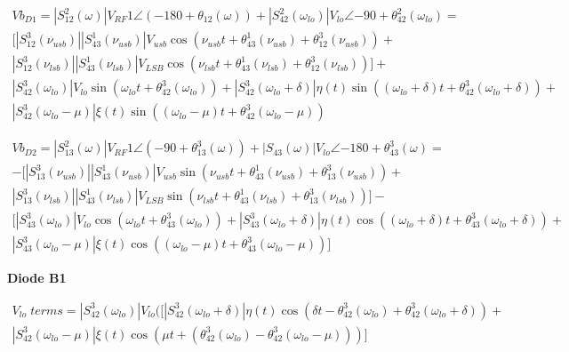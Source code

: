 \begin{equation}
    \begin{gathered}
        Vb_{D1} = |S_{12}^2(\omega)|V_{RF}1 \angle(-180+\theta_{12}(\omega)) + |S_{42}^2(\omega_{lo})|V_{lo}\angle{-90+\theta_{42}^2(\omega_{lo})} =\\
        \big[
        |S_{12}^3(\nu_{usb})||S_{43}^1(\nu_{usb})|V_{usb}\cos(\nu_{usb}t+\theta_{43}^1(\nu_{usb})+\theta_{12}^3(\nu_{usb}))+\\
        |S_{12}^3(\nu_{lsb})||S_{43}^1(\nu_{lsb})|V_{LSB}\cos(\nu_{lsb}t+\theta_{43}^1(\nu_{lsb})+\theta_{12}^3(\nu_{lsb}))\big]  + \\
        |S_{42}^3(\omega_{lo})|V_{lo}\sin(\omega_{lo}t+\theta_{42}^3(\omega_{lo}))+
        |S_{42}^3(\omega_{lo}+\delta)|\eta(t)\sin((\omega_{lo}+\delta)t+\theta_{42}^3(\omega_{lo}+\delta))+\\
        |S_{42}^3(\omega_{lo}-\mu)|\xi(t)\sin((\omega_{lo}-\mu)t+\theta_{42}^3(\omega_{lo}-\mu))
    \end{gathered}
\end{equation}

\vspace{1cm}

\begin{equation}
    \begin{gathered}
        Vb_{D2} = |S_{13}^2(\omega)|V_{RF}1 \angle(-90+\theta_{13}^3(\omega)) + |S_{43}(\omega)|V_{lo} \angle{-180+\theta_{43}^3(\omega)} = \\
        -\big[ |S_{13}^3(\nu_{usb})||S_{43}^1(\nu_{usb})|V_{usb}\sin(\nu_{usb}t+\theta_{43}^1(\nu_{usb})+\theta_{13}^3(\nu_{usb}))+\\
        |S_{13}^3(\nu_{lsb})||S_{43}^1(\nu_{lsb})|V_{LSB}\sin(\nu_{lsb}t+\theta_{43}^1(\nu_{lsb})+\theta_{13}^3(\nu_{lsb})) \big] -\\
        \big[|S_{43}^3(\omega_{lo})|V_{lo}\cos(\omega_{lo}t+\theta_{43}^3(\omega_{lo}))+ 
        |S_{43}^3(\omega_{lo}+\delta)|\eta(t)\cos((\omega_{lo}+\delta)t+\theta_{43}^3(\omega_{lo}+\delta))+\\
        |S_{43}^3(\omega_{lo}-\mu)|\xi(t)\cos((\omega_{lo}-\mu)t+\theta_{43}^3(\omega_{lo}-\mu)) \big]
    \end{gathered}
\end{equation}

\vspace{0.5cm}
\textbf{Diode B1}
\vspace{0.5cm}

\begin{equation}
\begin{gathered}
    V_{lo}\;terms = |S_{42}^3(\omega_{lo})|V_{lo}\big([ |S_{42}^3(\omega_{lo}+\delta)|\eta(t)
    \cos(\delta t-\theta_{42}^3(\omega_{lo})+\theta_{42}^3(\omega_{lo}+\delta)) + \\
    |S_{42}^3(\omega_{lo}-\mu)|\xi(t)\cos(\mu t+(\theta_{42}^3(\omega_{lo})-\theta_{42}^3(\omega_{lo}-\mu)))
    \big]
\end{gathered}
\end{equation}


